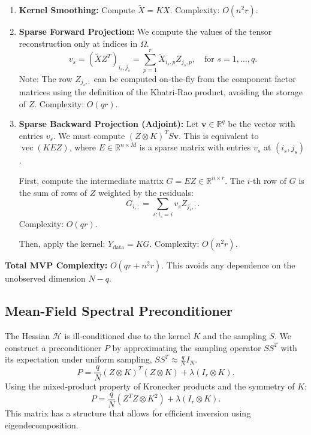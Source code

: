 \documentclass[11pt]{article}
\newcommand{\R}{\mathbb{R}}
\newcommand{\vecop}{\operatorname{vec}}
\newcommand{\Kron}{\otimes}
\begin{document}
\begin{enumerate}
    \item \textbf{Kernel Smoothing:} Compute $\tilde{X} = K X$. Complexity: $O(n^2 r)$.
    
    \item \textbf{Sparse Forward Projection:} We compute the values of the tensor reconstruction only at indices in $\Omega$.
    \[ v_s = (\tilde{X} Z^T)_{i_s, j_s} = \sum_{p=1}^r \tilde{X}_{i_s, p} Z_{j_s, p}, \quad \text{for } s = 1, \dots, q. \]
    Note: The row $Z_{j_s, :}$ can be computed on-the-fly from the component factor matrices using the definition of the Khatri-Rao product, avoiding the storage of $Z$.
    Complexity: $O(q r)$.
    
    \item \textbf{Sparse Backward Projection (Adjoint):} Let $\mathbf{v} \in \R^q$ be the vector with entries $v_s$. We must compute $(Z \Kron K)^T S \mathbf{v}$. This is equivalent to $\vecop(K E Z)$, where $E \in \R^{n \times M}$ is a sparse matrix with entries $v_s$ at $(i_s, j_s)$.
    
    First, compute the intermediate matrix $G = E Z \in \R^{n \times r}$. The $i$-th row of $G$ is the sum of rows of $Z$ weighted by the residuals:
    \[ G_{i, :} = \sum_{s : i_s = i} v_s Z_{j_s, :}. \]
    Complexity: $O(q r)$.
    
    Then, apply the kernel: $Y_{\text{data}} = K G$. Complexity: $O(n^2 r)$.
\end{enumerate}

\textbf{Total MVP Complexity:} $O(qr + n^2 r)$. This avoids any dependence on the unobserved dimension $N-q$.

\subsection{Mean-Field Spectral Preconditioner}

The Hessian $\mathcal{H}$ is ill-conditioned due to the kernel $K$ and the sampling $S$. We construct a preconditioner $P$ by approximating the sampling operator $S S^T$ with its expectation under uniform sampling, $S S^T \approx \frac{q}{N} I_N$.
\[
    P = \frac{q}{N} (Z \Kron K)^T (Z \Kron K) + \lambda (I_r \Kron K).
\]
Using the mixed-product property of Kronecker products and the symmetry of $K$:
\[
    P = \frac{q}{N} (Z^T Z \Kron K^2) + \lambda (I_r \Kron K).
\]
This matrix has a structure that allows for efficient inversion using eigendecomposition.
\end{document}
